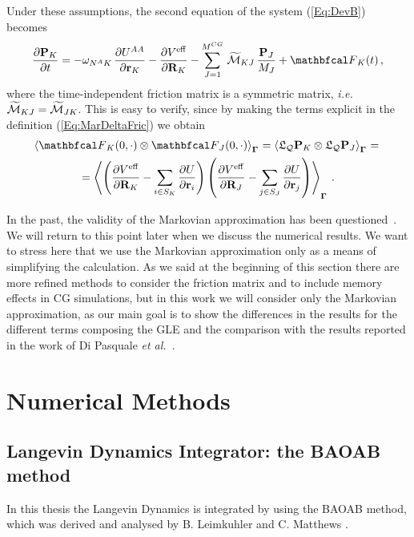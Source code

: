 \documentclass[10pt,a4paper]{book}
\theoremstyle{definition}
\begin{document}
\noindent
Under these assumptions, the second equation of the system (\ref{Eq:DevB}) becomes
\begin{equation}	
 \label{Eq:MarkovApprox}
  \pard{\bfP_{K}}{t} = -\omega_{\NA{}K} \, \pard{\pot^{AA}}{\bfr_{K}} 
                       -\pard{\Veff}{\bfR_{K}}
                       - \sum_{J=1}^{\ncg}\, \widetilde{\fricmat}_{KJ} \, \frac{\bfP_{J}}{M_{J}} 
                       + \fprojbf_{K}(t)\,,         
\end{equation}
where the time-independent friction matrix is a symmetric matrix, \textit{i.e.} $\widetilde{\mathcal{M}}_{KJ}=\widetilde{\mathcal{M}}_{JK}$. This is easy to verify, since by making the terms explicit in the definition (\ref{Eq:MarDeltaFric}) we obtain
\begin{multline}
\label{Eq:convFlucF}
  \aver{\fprojbf_K(0,\cdot) \otimes \fprojbf_J(0,\cdot)}_{\Bphase{}} = \aver{\Lio_\qproj\bfP_K \otimes \Lio_\qproj\bfP_J}_{\Bphase{}} ={}\\
  = \aver{ \cip{ \pard{\Veff}{\bfR_{K}} - \sum_{i\in S_K} \pard{U}{\bfr_{i}} } 
  \cip{ \pard{\Veff}{\bfR_{J}} - \sum_{j\in S_J} \pard{U}{\bfr_{j}} }}_{\Bphase{}}\,.
\end{multline}

In the past, the validity of the Markovian approximation has been questioned~\cite{CommentCubero,Cubero2005,Hijon2006,ResponseCommentHijon}. We will return to this point later when we discuss the numerical results. We want to stress here that we use the Markovian approximation only as a means of simplifying the calculation. As we said at the beginning of this section there are more refined methods to consider the friction matrix and to include memory effects in CG simulations, but in this work we will consider only the Markovian approximation, as our main goal is to show the differences in the results for the different terms composing the GLE and the comparison with the results reported in the work of Di Pasquale \textit{et al.}~\cite{DiPasquale2019}.

\chapter{Numerical Methods}
\label{Sec:NumMet}

\section{Langevin Dynamics Integrator: the BAOAB method}
In this thesis the Langevin Dynamics is integrated by using the BAOAB method, which was derived and analysed by B. Leimkuhler and C. Matthews \cite{LeimMatt:LAnDynInt}. 
\end{document}
